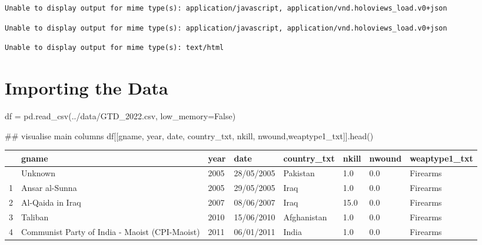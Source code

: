 \documentclass[
  letterpaper,
  DIV=11,
  numbers=noendperiod]{scrreprt}
\newenvironment{Shaded}{\begin{snugshade}}{\end{snugshade}}
\newcommand{\CommentTok}[1]{\textcolor[rgb]{0.37,0.37,0.37}{#1}}
\newcommand{\NormalTok}[1]{\textcolor[rgb]{0.00,0.23,0.31}{#1}}
\newcommand{\OperatorTok}[1]{\textcolor[rgb]{0.37,0.37,0.37}{#1}}
\newcommand{\StringTok}[1]{\textcolor[rgb]{0.13,0.47,0.30}{#1}}
\newcommand{\VariableTok}[1]{\textcolor[rgb]{0.07,0.07,0.07}{#1}}
\begin{document}
\begin{verbatim}
Unable to display output for mime type(s): application/javascript, application/vnd.holoviews_load.v0+json
\end{verbatim}

\begin{verbatim}
Unable to display output for mime type(s): application/javascript, application/vnd.holoviews_load.v0+json
\end{verbatim}

\begin{verbatim}
Unable to display output for mime type(s): text/html
\end{verbatim}

\hypertarget{importing-the-data}{%
\section{Importing the Data}\label{importing-the-data}}

\begin{Shaded}
\begin{Highlighting}[]
\NormalTok{df }\OperatorTok{=}\NormalTok{ pd.read\_csv(}\StringTok{\textquotesingle{}../data/GTD\_2022.csv\textquotesingle{}}\NormalTok{, low\_memory}\OperatorTok{=}\VariableTok{False}\NormalTok{)}
\end{Highlighting}
\end{Shaded}

\begin{Shaded}
\begin{Highlighting}[]
\CommentTok{\#\# visualise main columns}
\NormalTok{df[[}\StringTok{\textquotesingle{}gname\textquotesingle{}}\NormalTok{, }\StringTok{\textquotesingle{}year\textquotesingle{}}\NormalTok{, }\StringTok{\textquotesingle{}date\textquotesingle{}}\NormalTok{, }\StringTok{\textquotesingle{}country\_txt\textquotesingle{}}\NormalTok{, }\StringTok{\textquotesingle{}nkill\textquotesingle{}}\NormalTok{, }\StringTok{\textquotesingle{}nwound\textquotesingle{}}\NormalTok{,}\StringTok{\textquotesingle{}weaptype1\_txt\textquotesingle{}}\NormalTok{]].head()}
\end{Highlighting}
\end{Shaded}

\begin{longtable}[]{@{}llllllll@{}}
\toprule\noalign{}
& gname & year & date & country\_txt & nkill & nwound &
weaptype1\_txt \\
\midrule\noalign{}
\endhead
\bottomrule\noalign{}
\endlastfoot
0 & Unknown & 2005 & 28/05/2005 & Pakistan & 1.0 & 0.0 & Firearms \\
1 & Ansar al-Sunna & 2005 & 29/05/2005 & Iraq & 1.0 & 0.0 & Firearms \\
2 & Al-Qaida in Iraq & 2007 & 08/06/2007 & Iraq & 15.0 & 0.0 &
Firearms \\
3 & Taliban & 2010 & 15/06/2010 & Afghanistan & 1.0 & 0.0 & Firearms \\
4 & Communist Party of India - Maoist (CPI-Maoist) & 2011 & 06/01/2011 &
India & 1.0 & 0.0 & Firearms \\
\end{longtable}
\end{document}
